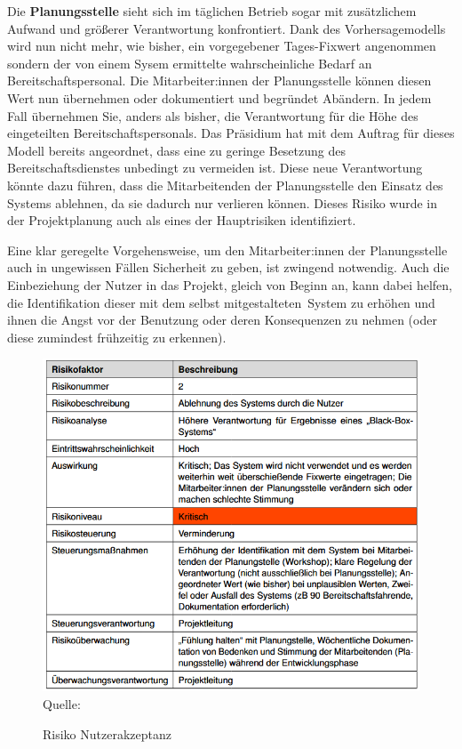 Die \textbf{Planungsstelle} sieht sich im täglichen Betrieb sogar mit zusätzlichem Aufwand und größerer Verantwortung konfrontiert. Dank des Vorhersagemodells wird nun nicht mehr, wie bisher, ein vorgegebener Tages-Fixwert angenommen sondern der von einem Sysem ermittelte wahrscheinliche Bedarf an Bereitschaftspersonal. Die Mitarbeiter:innen der Planungsstelle können diesen Wert nun übernehmen oder dokumentiert und begründet Abändern. In jedem Fall übernehmen Sie, anders als bisher, die Verantwortung für die Höhe des eingeteilten Bereitschaftspersonals. Das Präsidium hat mit dem Auftrag für dieses Modell bereits angeordnet, dass eine zu geringe Besetzung des Bereitschaftsdienstes unbedingt zu vermeiden ist. Diese neue Verantwortung könnte dazu führen, dass die Mitarbeitenden der Planungsstelle den Einsatz des Systems ablehnen, da sie dadurch nur verlieren können. Dieses Risiko wurde in der Projektplanung auch als eines der Hauptrisiken identifiziert.

Eine klar geregelte Vorgehensweise, um den Mitarbeiter:innen der Planungsstelle auch in ungewissen Fällen Sicherheit zu geben, ist zwingend notwendig. Auch die Einbeziehung der Nutzer in das Projekt, gleich von Beginn an, kann dabei helfen, die Identifikation dieser mit dem \glqq selbst mitgestalteten\grqq\ System zu erhöhen und ihnen die Angst vor der Benutzung oder deren Konsequenzen zu nehmen (oder diese zumindest frühzeitig zu erkennen). 

\begin{figure}[h]
\centering
\caption{Risiko Nutzerakzeptanz}
\includegraphics[width=15cm]{01_resources/risk2.png}\\
Quelle: \cite{grunsky_rettungsdienst_2025}
\label{fig:risk2}
\end{figure}
\FloatBarrier 


